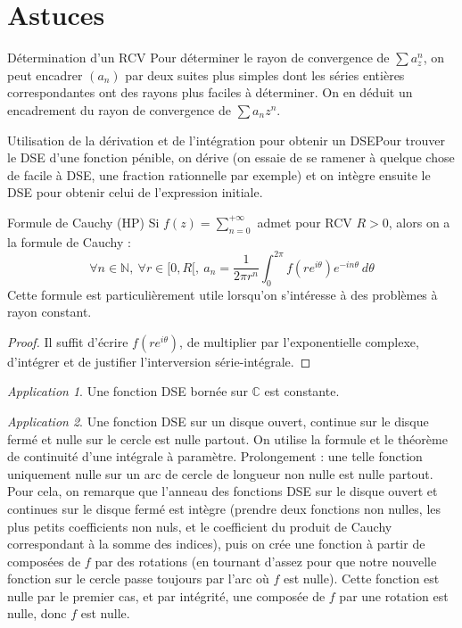 \documentclass[french]{book}
\newcommand{\N}{\mathbb{N}}
\newcommand{\C}{\mathbb{C}}
\theoremstyle{plain}
\theoremstyle{definition}
\theoremstyle{remark}
\newtheorem*{app}{Application}
\begin{document}
\section{Astuces}
\begin{AS}{Détermination d'un RCV} Pour déterminer le rayon de convergence de $\sum a_z^n$, on peut encadrer $(a_n)$ par deux suites plus simples dont les séries entières correspondantes ont des rayons plus faciles à déterminer. On en déduit un encadrement du rayon de convergence de $\sum a_nz^n$.
\end{AS}
\begin{AS}{Utilisation de la dérivation et de l'intégration pour obtenir un DSE}Pour trouver le DSE d’une fonction pénible, on dérive (on essaie de se ramener à quelque chose de facile à DSE, une fraction rationnelle par exemple) et on intègre ensuite le DSE pour obtenir celui de l’expression initiale.
\end{AS}
\begin{AS}{Formule de Cauchy (HP)} Si $f(z)=\displaystyle\sum_{n=0}^{+\infty}$ admet pour RCV $R>0$, alors on a la formule de Cauchy : $$\forall n\in\N,\ \forall r\in[0,R[,\ a_n=\frac{1}{2\pi r^n}\int_{0}^{2\pi}f(re^{i\theta})e^{-in\theta}\ d\theta$$ Cette formule est particulièrement utile lorsqu'on s'intéresse à des problèmes à rayon constant.
\end{AS}
\begin{proof}
	Il suffit d'écrire $f(re^{i\theta})$, de multiplier par l'exponentielle complexe, d'intégrer et de justifier l'interversion série-intégrale.
\end{proof}
\begin{app}
	Une fonction DSE bornée sur $\C$ est constante.
\end{app}
\begin{app}
	Une fonction DSE sur un disque ouvert, continue sur le disque fermé et nulle sur le cercle est nulle partout. On utilise la formule et le théorème de continuité d'une intégrale à paramètre. Prolongement : une telle fonction uniquement nulle sur un arc de cercle de longueur non nulle est nulle partout. Pour cela, on remarque que l'anneau des fonctions DSE sur le disque ouvert et continues sur le disque fermé est intègre (prendre deux fonctions non nulles, les plus petits coefficients non nuls, et le coefficient du produit de Cauchy correspondant à la somme des indices), puis on crée une fonction à partir de composées de $f$ par des rotations (en tournant d'assez pour que notre nouvelle fonction sur le cercle passe toujours par l'arc où $f$ est nulle). Cette fonction est nulle par le premier cas, et par intégrité, une composée de $f$ par une rotation est nulle, donc $f$ est nulle.
\end{app}
\end{document}
